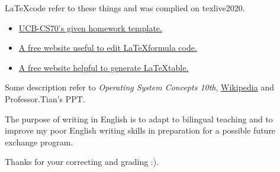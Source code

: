 \documentclass[11pt]{article}
\begin{document}
    \LaTeX \space code refer to these things and was complied on texlive2020.
    \begin{itemize}
        \item  \href{https://www.eecs70.org/assets/misc/homework_template.tex}{UCB-CS70's given homework template.} 
        \item  \href{https://www.latexlive.com}{A free website useful to edit \LaTeX \space formula code.}
        \item  \href{https://www.tablesgenerator.com/}{A free website helpful to generate \LaTeX \space table.}
    \end{itemize}

    Some description refer to \textit{Operating System Concepts 10th}, \href{https://en.wikipedia.org}{Wikipedia} 
    and Professor.Tian's PPT.

    The purpose of writing in English is to adapt to bilingual teaching and to improve my poor English 
    writing skills in preparation for a possible future exchange program. 

    Thanks for your correcting and grading :).
\end{document}
